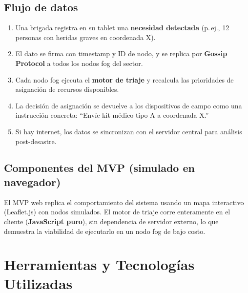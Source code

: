 \documentclass[12pt,a4paper]{article}
\begin{document}
\subsection{Flujo de datos}

\begin{enumerate}[leftmargin=1.5em]
  \item Una brigada registra en su tablet una \textbf{necesidad detectada}
        (p.\,ej., 12 personas con heridas graves en coordenada X).
  \item El dato se firma con timestamp y ID de nodo, y se replica por
        \textbf{Gossip Protocol} a todos los nodos fog del sector.
  \item Cada nodo fog ejecuta el \textbf{motor de triaje} y recalcula las
        prioridades de asignación de recursos disponibles.
  \item La decisión de asignación se devuelve a los dispositivos de campo como
        una instrucción concreta: ``Envíe kit médico tipo A a coordenada X.''
  \item Si hay internet, los datos se sincronizan con el servidor central para
        análisis post-desastre.
\end{enumerate}

\subsection{Componentes del MVP (simulado en navegador)}

El MVP web replica el comportamiento del sistema usando un mapa interactivo
(Leaflet.js) con nodos simulados. El motor de triaje corre enteramente en el
cliente (\textbf{JavaScript puro}), sin dependencia de servidor externo, lo
que demuestra la viabilidad de ejecutarlo en un nodo fog de bajo costo.

\section{Herramientas y Tecnologías Utilizadas}
\end{document}
